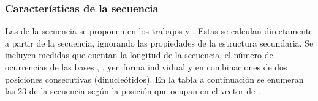 %
%
\subsubsection{Características de la secuencia}
%
Las  de la secuencia se proponen en los trabajos 
\cite{ng} y  \cite{batuwita}.
Estas  se calculan directamente a partir de la secuencia,
ignorando las propiedades de la estructura secundaria.
Se incluyen medidas que cuentan la longitud de la secuencia, el número
de ocurrencias de las bases \ntA, \ntG, \ntC y\ntU en forma individual
y en combinaciones de dos posiciones consecutivas (dinucleótidos).
En la tabla a continuación se enumeran las 23  de la
secuencia según la posición que ocupan en el vector de .
